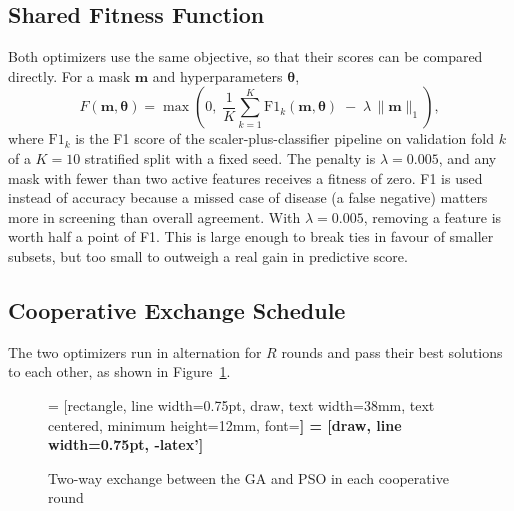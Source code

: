 \documentclass[MTech]{ugthesis}
\begin{document}
\subsection{Shared Fitness Function}
Both optimizers use the same objective, so that their scores can be compared directly. For a mask $\mathbf{m}$ and hyperparameters $\boldsymbol{\theta}$,
\begin{equation}
F(\mathbf{m},\boldsymbol{\theta}) = \max\!\left(0,\; \frac{1}{K}\sum_{k=1}^{K} \mathrm{F1}_k(\mathbf{m},\boldsymbol{\theta}) \;-\; \lambda\,\|\mathbf{m}\|_1 \right),
\label{eq:fitness}
\end{equation}
where $\mathrm{F1}_k$ is the F1 score of the scaler-plus-classifier pipeline on validation fold $k$ of a $K=10$ stratified split with a fixed seed. The penalty is $\lambda = 0.005$, and any mask with fewer than two active features receives a fitness of zero. F1 is used instead of accuracy because a missed case of disease (a false negative) matters more in screening than overall agreement. With $\lambda=0.005$, removing a feature is worth half a point of F1. This is large enough to break ties in favour of smaller subsets, but too small to outweigh a real gain in predictive score.

\subsection{Cooperative Exchange Schedule}
The two optimizers run in alternation for $R$ rounds and pass their best solutions to each other, as shown in Figure~\ref{fig:coop}.

\begin{figure}[htpb]
\centering
{} = [rectangle, line width=0.75pt, draw, text width=38mm, text centered, minimum height=12mm, font=\footnotesize\bfseries]
 = [draw, line width=0.75pt, -latex']
\caption{Two-way exchange between the GA and PSO in each cooperative round}
\label{fig:coop}
\end{figure}
\end{document}
